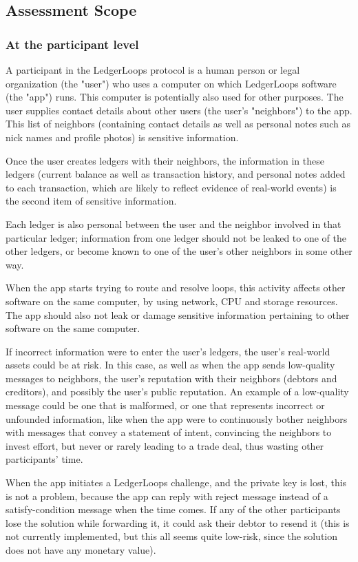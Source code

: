 \documentclass[11pt,twoside,a4paper]{article}
\begin{document}
\subsection{Assessment Scope}
\subsubsection{At the participant level}
A participant in the LedgerLoops protocol is a human person or legal organization (the "user") who uses a computer on which LedgerLoops software (the "app") runs. This computer is potentially also used for other purposes. The user supplies contact details about other users (the user's "neighbors") to the app. This list of neighbors (containing contact details as well as personal notes such as nick names and profile photos) is sensitive information.

Once the user creates ledgers with their neighbors, the information in these ledgers (current balance as well as transaction history, and personal notes added to each transaction, which are likely to reflect evidence of real-world events) is the second item of sensitive information.

Each ledger is also personal between the user and the neighbor involved in that particular ledger; information from one ledger should not be leaked to one of the other ledgers, or become known to one of the user's other neighbors in some other way.

When the app starts trying to route and resolve loops, this activity affects other software on the same computer, by using network, CPU and storage resources. The app should also not leak or damage sensitive information pertaining to other software on the same computer.

If incorrect information were to enter the user's ledgers, the user's real-world assets could be at risk.
In this case, as well as when the app sends low-quality messages to neighbors, the user's reputation with their neighbors (debtors and creditors), and possibly the user's public reputation. An example of a low-quality message could be one that is malformed, or one that represents incorrect or unfounded information, like when the app were to continuously bother neighbors with messages that convey a statement of intent, convincing the neighbors to invest effort, but never or rarely leading to a trade deal, thus wasting other participants' time.

When the app initiates a LedgerLoops challenge, and the private key is lost, this is not a problem, because the app can reply with reject message instead of a satisfy-condition message when the time comes. If any of the other participants lose the solution while forwarding it, it could ask their debtor to resend it (this is not currently implemented, but this all seems quite low-risk, since the solution does not have any monetary value).
\end{document}
